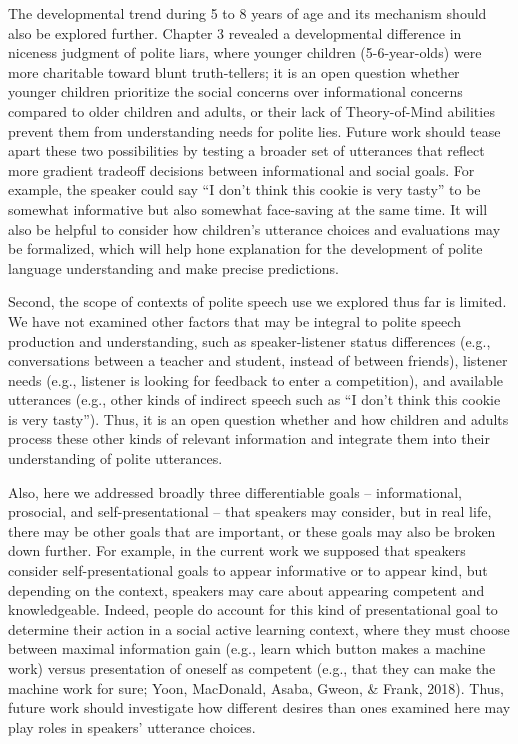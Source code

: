 \documentclass[oneside]{report}
\begin{document}
The developmental trend during 5 to 8 years of age and its mechanism
should also be explored further. Chapter 3 revealed a developmental
difference in niceness judgment of polite liars, where younger children
(5-6-year-olds) were more charitable toward blunt truth-tellers; it is
an open question whether younger children prioritize the social concerns
over informational concerns compared to older children and adults, or
their lack of Theory-of-Mind abilities prevent them from understanding
needs for polite lies. Future work should tease apart these two
possibilities by testing a broader set of utterances that reflect more
gradient tradeoff decisions between informational and social goals. For
example, the speaker could say ``I don't think this cookie is very
tasty'' to be somewhat informative but also somewhat face-saving at the
same time. It will also be helpful to consider how children's utterance
choices and evaluations may be formalized, which will help hone
explanation for the development of polite language understanding and
make precise predictions.

Second, the scope of contexts of polite speech use we explored thus far
is limited. We have not examined other factors that may be integral to
polite speech production and understanding, such as speaker-listener
status differences (e.g., conversations between a teacher and student,
instead of between friends), listener needs (e.g., listener is looking
for feedback to enter a competition), and available utterances (e.g.,
other kinds of indirect speech such as ``I don't think this cookie is
very tasty''). Thus, it is an open question whether and how children and
adults process these other kinds of relevant information and integrate
them into their understanding of polite utterances.

Also, here we addressed broadly three differentiable goals --
informational, prosocial, and self-presentational -- that speakers may
consider, but in real life, there may be other goals that are important,
or these goals may also be broken down further. For example, in the
current work we supposed that speakers consider self-presentational
goals to appear informative or to appear kind, but depending on the
context, speakers may care about appearing competent and knowledgeable.
Indeed, people do account for this kind of presentational goal to
determine their action in a social active learning context, where they
must choose between maximal information gain (e.g., learn which button
makes a machine work) versus presentation of oneself as competent (e.g.,
that they can make the machine work for sure; Yoon, MacDonald, Asaba,
Gweon, \& Frank, 2018). Thus, future work should investigate how
different desires than ones examined here may play roles in speakers'
utterance choices.
\end{document}
